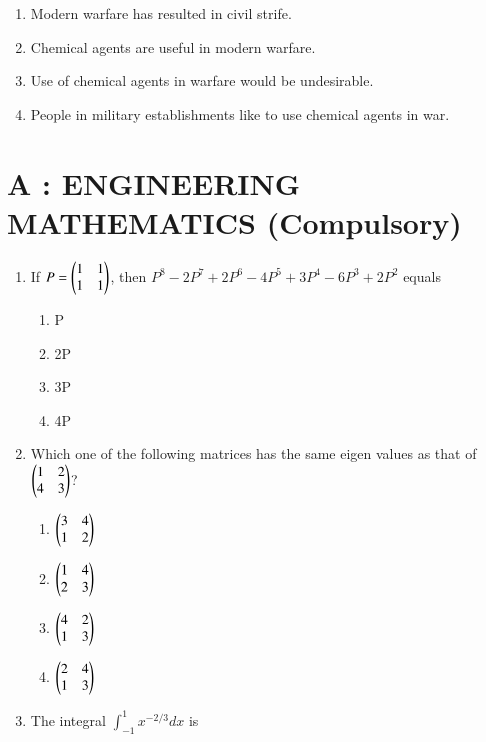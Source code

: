 \documentclass[a4paper,10pt]{article}
\begin{document}
\begin{enumerate}
\begin{enumerate}
\item Modern warfare has resulted in civil strife.
\item Chemical agents are useful in modern warfare.
\item Use of chemical agents in warfare would be undesirable.
\item People in military establishments like to use chemical agents in war.
\end{enumerate}
\end{enumerate}

\section*{A : ENGINEERING MATHEMATICS (Compulsory)}
\begin{enumerate}
\item If $P = \begin{pmatrix}1 & 1 \\ 1 & 1\end{pmatrix}$, then $P^8 - 2P^7 + 2P^6 - 4P^5 + 3P^4 - 6P^3 + 2P^2$ equals
\hfill{}

\begin{multicols}{4}
\begin{enumerate}
\item P
\item 2P
\item 3P
\item 4P
\end{enumerate}
\end{multicols}

\item Which one of the following matrices has the same eigen values as that of $\begin{pmatrix}1 & 2 \\ 4 & 3\end{pmatrix}$?
\hfill{}

\begin{multicols}{2}
\begin{enumerate}
\item $\begin{pmatrix}3 & 4 \\ 1 & 2\end{pmatrix}$
\item $\begin{pmatrix}1 & 4 \\ 2 & 3\end{pmatrix}$
\item $\begin{pmatrix}4 & 2 \\ 1 & 3\end{pmatrix}$
\item $\begin{pmatrix}2 & 4 \\ 1 & 3\end{pmatrix}$
\end{enumerate}
\end{multicols}

\item The integral $\int_{-1}^{1} x^{-2/3} dx$ is
\hfill{}


\end{enumerate}
\end{document}
